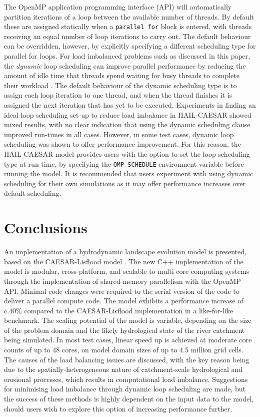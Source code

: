 The OpenMP application programming interface (API) will automatically partition iterations of a loop between the available number of threads. By default these are assigned statically when a \texttt{parallel for} block is entered, with threads receiving an equal number of loop iterations to carry out. The default behaviour can be overridden, however, by explicitly specifying a different scheduling type for parallel for loops. For load imbalanced problems such as discussed in this paper, the \textit{dynamic} loop scheduling can improve parallel performance by reducing the amount of idle time that threads spend waiting for busy threads to complete their workload \citep{willebeek1993strategies,olivier2012openmp}. The default behaviour of the dynamic scheduling type is to assign each loop iteration to one thread, and when the thread finishes it is assigned the next iteration that has yet to be executed. Experiments in finding an ideal loop scheduling set-up to reduce load imbalance in HAIL-CAESAR showed mixed results, with no clear indication that using the dynamic scheduling clause improved run-times in all cases. However, in some test cases, dynamic loop scheduling was shown to offer performance improvement. For this reason, the HAIL-CAESAR model provides users with the option to set the loop scheduling type at run time, by specifying the \texttt{OMP\_SCHEDULE} environment variable before running the model. It is recommended that users experiment with using dynamic scheduling for their own simulations as it may offer performance increases over default scheduling.



\section{Conclusions}  %
An implementation of a hydrodynamic landscape evolution model is presented, based on the CAESAR-Lisflood model \citep{Coulthard2013}. The new C++ implementation of the model is modular, cross-platform, and scalable to multi-core computing systems through the implementation of shared-memory parallelism with the OpenMP API. Minimal code changes were required to the serial version of the code to deliver a parallel compute code. The model exhibits a performance increase of c.40\% compared to the CAESAR-Lisflood implementation in a like-for-like benchmark. The scaling potential of the model is variable, depending on the size of the problem domain and the likely hydrological state of the river catchment being simulated. In most test cases, linear speed up is achieved at moderate core counts of up to 48 cores, on model domain sizes of up to 4.5 million grid cells. The causes of the load balancing issues are discussed, with the key reason being due to the spatially-heterogeneous nature of catchment-scale hydrological and erosional processes, which results in computational load imbalance. Suggestions for minimising load imbalance through dynamic loop scheduling are made, but the success of these methods is highly dependent on the input data to the model, should users wish to explore this option of increasing performance further.
